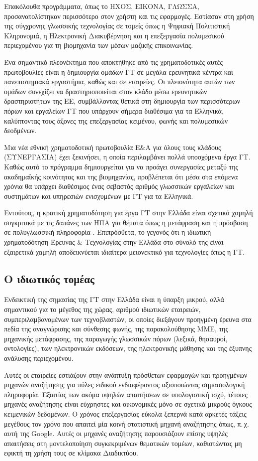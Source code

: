 \documentclass[]{../../metanetpaper}
\begin{document}
\begin{multicols}{2}
Επακόλουθα προγράμματα, όπως το ΗΧΟΣ, ΕΙΚΟΝΑ, ΓΛΩΣΣΑ, προσανατολίστηκαν περισσότερο στον χρήστη και τις εφαρμογές. Εστίασαν στη χρήση της σύγχρονης γλωσσικής τεχνολογίας σε τομείς όπως η Ψηφιακή Πολιτιστική Κληρονομιά, η Ηλεκτρονική Διακυβέρνηση και η επεξεργασία πολυμεσικού περιεχομένου για τη βιομηχανία των μέσων μαζικής επικοινωνίας.

Ένα σημαντικό πλεονέκτημα που αποκτήθηκε από τις χρηματοδοτικές αυτές πρωτοβουλίες είναι η δημιουργία ομάδων ΓΤ σε μεγάλα ερευνητικά κέντρα και πανεπιστημιακά εργαστήρια, καθώς και σε εταιρείες. Οι πλειονότητα αυτών των ομάδων συνεχίζει να δραστηριοποιείται στον κλάδο μέσω ερευνητικών δραστηριοτήτων της ΕΕ, συμβάλλοντας θετικά στη δημιουργία των περισσότερων πόρων και εργαλείων ΓΤ που υπάρχουν σήμερα διαθέσιμα για τα Ελληνικά, καλύπτοντας τους άξονες της επεξεργασίας κειμένου, φωνής και πολυμεσικών δεοδμένων. 

Μια νέα εθνική χρηματοδοτική πρωτοβουλία Ε\&Α για όλους τους κλάδους (ΣΥΝΕΡΓΑΣΙΑ) έχει ξεκινήσει, η οποία περιλαμβάνει πολλά υποσχόμενα έργα ΓΤ. Καθώς αυτό το πρόγραμμα δημιουργείται για να προάγει συνεργασίες μεταξύ της ακαδημαϊκής κοινότητας και της βιομηχανίας, προβλέπεται ότι μέσα στα επόμενα χρόνια θα υπάρχει διαθέσιμος ένας σεβαστός αριθμός γλωσσικών εργαλείων και συστημάτων και υπηρεσιών ενισχυμένων με ΓΤ για τα Ελληνικά.

Εντούτοις, η κρατική χρηματοδότηση για έργα ΓΤ στην Ελλάδα είναι σχετικά χαμηλή συγκριτικά με τις δαπάνες των ΗΠΑ για θέματα όπως η μετάφραση και η πρόσβαση σε πολυγλωσσική πληροφορία \cite{laz2}. Επιπρόσθετα, το γεγονός ότι η ιδιωτική χρηματοδότηση Έρευνας \& Τεχνολογίας στην Ελλάδα στο σύνολό της είναι εξαιρετικά χαμηλή αποδεικνύεται ιδιαίτερα μειονεκτικό για τεχνολογίες όπως η ΓΤ.

\subsection{Ο ιδιωτικός τομέας}

Ενδεικτική της σημασίας της ΓΤ στην Ελλάδα είναι η ύπαρξη μικρού, αλλά σημαντικού για το μέγεθος της χώρας, αριθμού ιδιωτικών εταιρειών, συμπεριλαμβανομένων των τεχνοβλαστών, οι οποίες διεξάγουν προηγμένη έρευνα στα πεδία της αναγνώρισης και σύνθεσης φωνής, της παρακολούθησης ΜΜΕ, της μηχανικής μετάφρασης, της παραγωγής γλωσσικών πόρων (λεξικά, θησαυροί, οντολογίες), των ηλεκτρονικών εκδόσεων, της ηλεκτρονικής μάθησης και της έξυπνης ανάλυσης περιεχομένου.

Αυτές οι εταιρείες εστιάζουν στην ανάπτυξη πρόσθετων  εφαρμογών και προηγμένων μηχανών αναζήτησης για πύλες ειδικού ενδιαφέροντος αξιοποιώντας σημασιολογική πληροφορία. Εξαιτίας των ακόμα υψηλών απαιτήσεων σε υπολογιστική ισχύ, τέτοιες μηχανές αναζήτησης είναι εύχρηστες και οικονομικές  μόνο σε σχετικά μικρούς όγκους κειμενικών δεδομένων. Ο χρόνος επεξεργασίας εύκολα ξεπερνά κατά αρκετές τάξεις μεγέθους τον χρόνο που απαιτεί μία κοινή  στατιστική μηχανή αναζήτησης όπως, π.\,χ. αυτή της Google. Αυτές οι μηχανές αναζήτησης παρουσιάζουν επίσης υψηλές απαιτήσεις  στη μοντελοποίηση συγκεκριμένων θεματικών τομέων, καθιστώντας μη εφικτή τη χρήση τους σε  κλίμακα Διαδικτύου.


\end{multicols}
\end{document}
